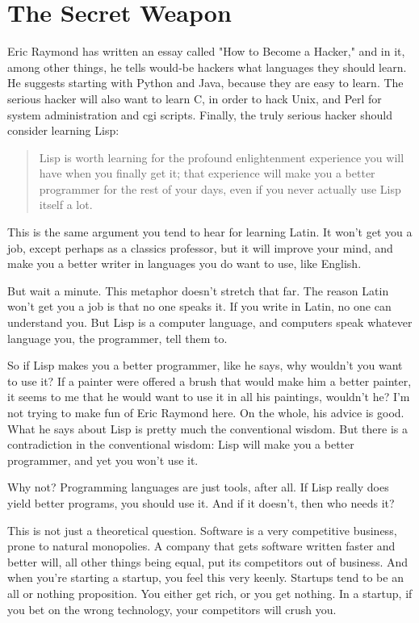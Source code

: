 \documentclass[10pt,twoside,openright]{memoir}
\begin{document}
\section{The Secret Weapon}

Eric Raymond has written an essay called "How to Become a Hacker," and in it, among other things, he tells would-be hackers what languages they should learn. He suggests starting with Python and Java, because they are easy to learn. The serious hacker will also want to learn C, in order to hack Unix, and Perl for system administration and cgi scripts. Finally, the truly serious hacker should consider learning Lisp:

\begin{quote}
Lisp is worth learning for the profound enlightenment experience you will have when you finally get it; that experience will make you a better programmer for the rest of your days, even if you never actually use Lisp itself a lot.
\end{quote}

This is the same argument you tend to hear for learning Latin. It won't get you a job, except perhaps as a classics professor, but it will improve your mind, and make you a better writer in languages you do want to use, like English.

But wait a minute. This metaphor doesn't stretch that far. The reason Latin won't get you a job is that no one speaks it. If you write in Latin, no one can understand you. But Lisp is a computer language, and computers speak whatever language you, the programmer, tell them to.

So if Lisp makes you a better programmer, like he says, why wouldn't you want to use it? If a painter were offered a brush that would make him a better painter, it seems to me that he would want to use it in all his paintings, wouldn't he? I'm not trying to make fun of Eric Raymond here. On the whole, his advice is good. What he says about Lisp is pretty much the conventional wisdom. But there is a contradiction in the conventional wisdom: Lisp will make you a better programmer, and yet you won't use it.

Why not? Programming languages are just tools, after all. If Lisp really does yield better programs, you should use it. And if it doesn't, then who needs it?

This is not just a theoretical question. Software is a very competitive business, prone to natural monopolies. A company that gets software written faster and better will, all other things being equal, put its competitors out of business. And when you're starting a startup, you feel this very keenly. Startups tend to be an all or nothing proposition. You either get rich, or you get nothing. In a startup, if you bet on the wrong technology, your competitors will crush you.
\end{document}
